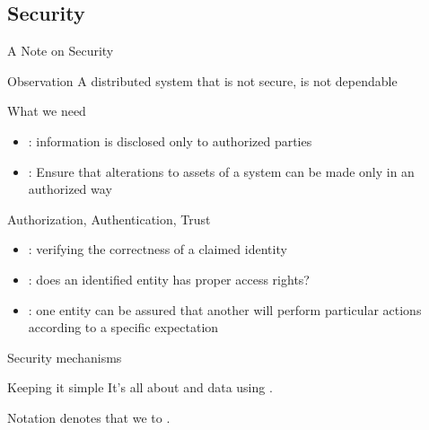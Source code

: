 \subsection{Security}
\begin{frame}{A Note on Security}
  \begin{alertblock}{Observation}
    A distributed system that is not secure, is not dependable
  \end{alertblock}
  \onslide
  \begin{block}{What we need}
    \begin{itemize}\firmlist
      \item {}: information is disclosed only to authorized parties
      \item {}: Ensure that alterations to assets of a system can be made only in an authorized way
    \end{itemize}
  \end{block}
  \onslide
  \begin{block}{Authorization, Authentication, Trust}
    \begin{itemize}\firmlist
      \item {}: verifying the correctness of a claimed identity
      \item {}: does an identified entity has proper access rights?
      \item {}: one entity can be assured that another will perform particular actions
            according to a specific expectation
    \end{itemize}
  \end{block}
\end{frame}

\begin{frame}{Security mechanisms}
  \begin{block}{Keeping it simple}
    It's all about  and  data using .
  \end{block}
  \begin{block}{Notation}
     denotes that we  to .
  \end{block}
\end{frame}

